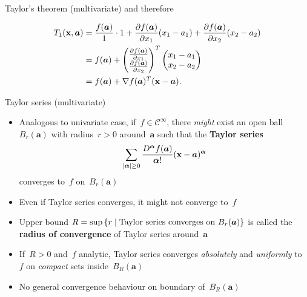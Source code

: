 \documentclass[11pt,compress,t,notes=noshow, xcolor=table]{beamer}
\begin{document}
\begin{vbframe}{Taylor's theorem (multivariate)}
and therefore

\vspace{-\baselineskip}

\begin{align*}
    T_1(\mathbf{x},\bm{a}) &= \frac{f(\bm{a})}{1} \cdot 1 + \frac{\partial f(\bm{a})}{\partial x_1} (x_1 - a_1) + \frac{\partial f(\bm{a})}{\partial x_2} (x_2 - a_2) \\
    &= f(\bm{a}) + \begin{pmatrix}\frac{\partial f(\bm{a})}{\partial x_1} \\ \frac{\partial f(\bm{a})}{\partial x_2}\end{pmatrix}^T \begin{pmatrix}x_1 - a_1 \\ x_2 - a_2\end{pmatrix} \\
    &= f(\bm{a}) + \nabla f(\bm{a})^T (\mathbf{x} - \bm{a}). 
\end{align*}

\end{vbframe}

\begin{vbframe}{Taylor series (multivariate)}

\begin{itemize}
    \item Analogous to univariate case, if~$f \in \mathcal{C}^\infty$, there \textit{might} exist an open ball~$B_r(\bm{a})$ with radius~$r>0$ around~$\bm{a}$ such that the \textbf{Taylor series}
        \begin{equation*}
            \sum_{|\bm{\alpha}| \geq 0} \frac{D^{\bm{\alpha}} f(\bm{a})}{{\bm{\alpha}}!} (\mathbf{x} - \bm{a})^{\bm{\alpha}}
        \end{equation*}
        converges to~$f$ on~$B_r(\bm{a})$
    \item Even if Taylor series converges, it might not converge to~$f$
    \item Upper bound $R = \sup \left\lbrace r \;|\; \textnormal{Taylor series converges on } B_r(\bm{a}) \right\rbrace$ is called the \textbf{radius of convergence} of Taylor series around~$\bm{a}$
    \item If~$R>0$ and~$f$ analytic, Taylor series converges \textit{absolutely} and \textit{uniformly} to~$f$ on \textit{compact} sets inside~$B_R(\bm{a})$
    \item No general convergence behaviour on boundary of~$B_R(\bm{a})$
\end{itemize}

\end{vbframe}

\endlecture
\end{document}
